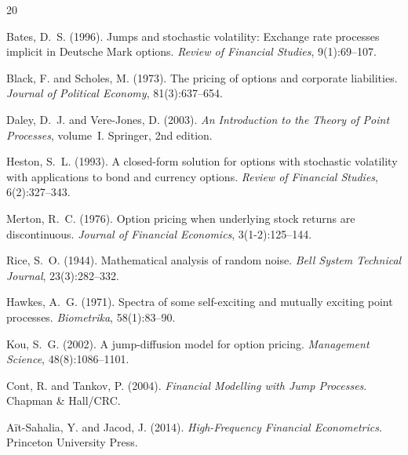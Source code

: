 \documentclass[11pt,a4paper]{article}
\begin{document}

\begin{thebibliography}{20}

Bates, D.~S. (1996).
\newblock Jumps and stochastic volatility: Exchange rate processes implicit
  in Deutsche Mark options.
\newblock \emph{Review of Financial Studies}, 9(1):69--107.

Black, F. and Scholes, M. (1973).
\newblock The pricing of options and corporate liabilities.
\newblock \emph{Journal of Political Economy}, 81(3):637--654.

Daley, D.~J. and Vere-Jones, D. (2003).
\newblock \emph{An Introduction to the Theory of Point Processes}, volume~I.
\newblock Springer, 2nd edition.

Heston, S.~L. (1993).
\newblock A closed-form solution for options with stochastic volatility with
  applications to bond and currency options.
\newblock \emph{Review of Financial Studies}, 6(2):327--343.

Merton, R.~C. (1976).
\newblock Option pricing when underlying stock returns are discontinuous.
\newblock \emph{Journal of Financial Economics}, 3(1-2):125--144.

Rice, S.~O. (1944).
\newblock Mathematical analysis of random noise.
\newblock \emph{Bell System Technical Journal}, 23(3):282--332.

Hawkes, A.~G. (1971).
\newblock Spectra of some self-exciting and mutually exciting point processes.
\newblock \emph{Biometrika}, 58(1):83--90.

Kou, S.~G. (2002).
\newblock A jump-diffusion model for option pricing.
\newblock \emph{Management Science}, 48(8):1086--1101.

Cont, R. and Tankov, P. (2004).
\newblock \emph{Financial Modelling with Jump Processes}.
\newblock Chapman \& Hall/CRC.

A\"{i}t-Sahalia, Y. and Jacod, J. (2014).
\newblock \emph{High-Frequency Financial Econometrics}.
\newblock Princeton University Press.

\end{thebibliography}
\end{document}
